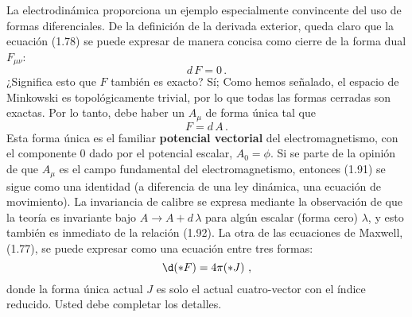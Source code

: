\documentclass[11pt,b5paper,openany,twoside]{book}
\begin{document}
La electrodinámica proporciona un ejemplo especialmente convincente del uso de formas diferenciales.
De la definición de la derivada exterior, queda claro que la ecuación (1.78) se puede expresar de manera concisa como cierre de la forma dual $F_{\mu\nu}$:
\begin{equation}
 d\,F = 0\,.\label{1.91}
\end{equation}
¿Significa esto que $F$ también es exacto? Sí; Como hemos señalado, el espacio de Minkowski es topológicamente trivial, por lo que todas las formas cerradas son exactas.
Por lo tanto, debe haber un $A_\mu$ de forma única tal que
\begin{equation}
F =  d\,A\,.\label{1.92}
\end{equation}
Esta forma única es el familiar {\bf potencial vectorial} del electromagnetismo, con el componente $0$ dado por el potencial escalar, $A_0 = \phi$.
Si se parte de la opinión de que $A_\mu$ es el campo fundamental del electromagnetismo, entonces (1.91) se sigue como una identidad (a diferencia de una ley dinámica, una ecuación de movimiento).
La invariancia de calibre se expresa mediante la observación de que la teoría es invariante bajo $A \rightarrow A + d\,\lambda$ para algún escalar (forma cero) $\lambda$, y esto también es inmediato de la relación (1.92).
La otra de las ecuaciones de Maxwell, (1.77), se puede expresar como una ecuación entre tres formas:
\begin{equation}
\d(*F) = 4\pi(* J)\ ,\label{1.93}
\end{equation}
donde la forma única actual $J$ es solo el actual cuatro-vector con el índice reducido.
Usted debe completar los detalles.
\end{document}
